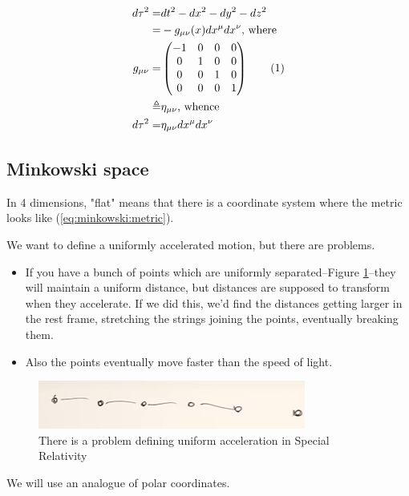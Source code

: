 \documentclass[]{article}
\newcommand\numberthis{\addtocounter{equation}{1}\tag{\theequation}}
\begin{document}
{\begin{align*}
	d \tau^2 =& dt^2 -dx^2 -dy^2 -dz^2\\
	=& - g_{\mu\nu}(x) dx^\mu dx^\nu \text{, where }\\
	g_{\mu\nu} =& \begin{pmatrix}
		-1 &0&0&0\\
		0&1&0&0\\
		0&0&1&0\\
		0&0&0&1
	\end{pmatrix} \numberthis \label{eq:minkowski:metric}\\
	\triangleq& \eta_{\mu\nu} \text{, whence} \\
	d \tau^2=& \eta_{\mu\nu} dx^\mu dx^\nu
\end{align*}

\subsection{Minkowski space}

In 4 dimensions, "flat" means that there is a coordinate system where the metric looks like (\ref{eq:minkowski:metric}).

We want to define a uniformly accelerated motion, but there are problems. \begin{itemize}
	\item If you have a bunch of points which are uniformly separated--Figure  \ref{fig:gr-4-uniform-acceleration}--they will maintain a uniform distance, but distances are supposed to transform when they accelerate. If we did this, we'd find the distances getting larger in the rest frame, stretching the strings joining the points, eventually breaking them.
	\item Also the points eventually move faster than the speed of light.
\end{itemize}

\begin{figure}[H]
	\caption[Defining uniform acceleration in Special Relativity]{There is a problem defining uniform acceleration in Special Relativity }\label{fig:gr-4-uniform-acceleration}
	\includegraphics{gr-4-uniform-acceleration}
\end{figure}

We will use an analogue of polar coordinates.

}
\end{document}
